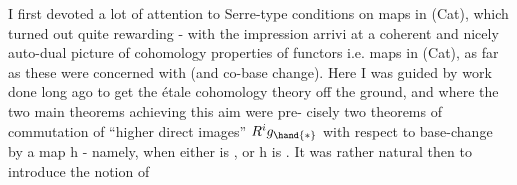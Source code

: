 I first devoted a lot of attention to Serre-type
conditions on maps in (Cat), which turned out quite rewarding - with
the impression  arrivi at a coherent and nicely auto-dual picture of
cohomology properties of functors i.e. maps in (Cat), as far as these
were concerned with  (and \hand{\uline{\textcolor{black}{not}}} co-base change). Here
I was guided by work done long ago to get the étale cohomology theory off
the ground, and where the two main theorems achieving this aim were pre-%
cisely two theorems of commutation of ``higher direct images'' $R^{i}g_{\hand{*}}$ with
respect to base-change by a map h - namely,  when either  is \hand{\uline{\textcolor{black}{proper}}},
or h is \hand{\uline{\textcolor{black}{smooth}}}. It was rather natural then to introduce the notion of


